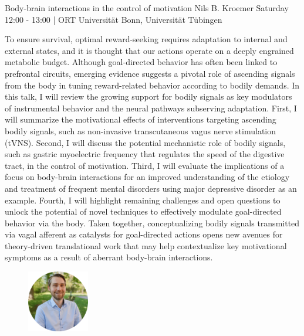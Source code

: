
\begin{keynote}
    {Body-brain interactions in the control of motivation}
    {Nils B. Kroemer}
    {Saturday 12:00 - 13:00 | ORT}
    {Universität Bonn, Universität Tübingen}

    To ensure survival, optimal reward-seeking requires adaptation to internal and external states, and it is thought that our actions operate on a deeply engrained metabolic budget. Although goal-directed behavior has often been linked to prefrontal circuits, emerging evidence suggests a pivotal role of ascending signals from the body in tuning reward-related behavior according to bodily demands. In this talk, I will review the growing support for bodily signals as key modulators of instrumental behavior and the neural pathways subserving adaptation. First, I will summarize the motivational effects of interventions targeting ascending bodily signals, such as non-invasive transcutaneous vagus nerve stimulation (tVNS). Second, I will discuss the potential mechanistic role of bodily signals, such as gastric myoelectric frequency that regulates the speed of the digestive tract, in the control of motivation. Third, I will evaluate the implications of a focus on body-brain interactions for an improved understanding of the etiology and treatment of frequent mental disorders using major depressive disorder as an example. Fourth, I will highlight remaining challenges and open questions to unlock the potential of novel techniques to effectively modulate goal-directed behavior via the body. Taken together, conceptualizing bodily signals transmitted via vagal afferent as catalysts for goal-directed actions opens new avenues for theory-driven translational work that may help contextualize key motivational symptoms as a result of aberrant body-brain interactions.

    \vspace*{0.5cm}

    \begin{figure}[H]
        \raggedleft
        \includegraphics[width=0.24\textwidth]{tex/images/keynote_speaker/kroemer_cropped.png}
    \end{figure}

\end{keynote}

